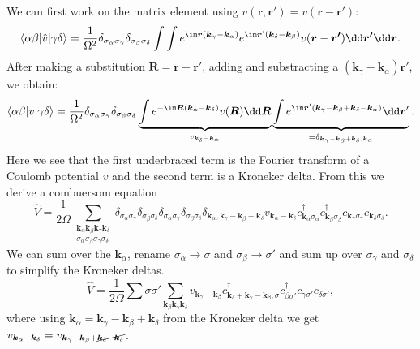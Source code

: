 \documentclass[../main.tex]{subfile}
\begin{document}
We can first work on the matrix element using $v(\bm{r}, \bm{r'})= v(\bm{r} - \bm{r'})$:
\[
    \langle \alpha \beta |\hat{v}|\gamma\delta\rangle = \frac{1}{\Omega^2} \delta_{\sigma_{\alpha}\sigma_{\gamma}}\delta_{\sigma_{\beta}\sigma_{\delta}} \int \int  e^{\im \bm{r}(\bm{k}_{\gamma}-\bm{k}_{\alpha})}  e^{\im \bm{r}'(\bm{k}_{\delta}-\bm{k}_{\beta})} v(\bm{r} - \bm{r'}) \dd \bm{r'} \dd \bm{r}.
\]
After making a substitution $\bm{R} = \bm{r} - \bm{r}'$, adding and substracting a $(\bm{k}_{\gamma}-\bm{k}_{\alpha})\bm{r}'$, we obtain:
\[
    \langle \alpha \beta |v|\gamma\delta\rangle = \frac{1}{\Omega^2} \delta_{\sigma_{\alpha}\sigma_{\gamma}}\delta_{\sigma_{\beta}\sigma_{\delta}}
     \underbrace{\int e^{-\im\bm{R}(\bm{k}_{\alpha}- \bm{k}_{\delta})} v(\bm{R}) \dd \bm{R}}_{v_{\bm{k}_{\delta}- \bm{k}_{\alpha}}}
    \underbrace{\int e^{\im\bm{r}'\left(\bm{k}_{\gamma}-\bm{k}_{\beta} + \bm{k}_{\delta} -\bm{k}_{\alpha}\right)}\dd \bm{r}'}_{= \delta_{\bm{k}_{\gamma}-\bm{k}_{\beta} + \bm{k}_{\delta} , \bm{k}_{\alpha}}}.
\]
Here we see that the first underbraced term is the Fourier transform of a Coulomb potential $v$ and the second term is a Kroneker delta.
From this we derive a combuersom equation
\[
    \hat{V} = \frac{1}{2\Omega} \sum_{\substack{\bm{k}_{\alpha}\bm{k}_{\beta}\bm{k}_{\gamma}\bm{k}_{\delta} \\
         \sigma_{\alpha}\sigma_{\beta}\sigma_{\gamma}\sigma_{\delta}}}
    \delta_{\sigma_{\alpha}\sigma_{\gamma}}\delta_{\sigma_{\beta}\sigma_{\delta}}
    \delta_{\sigma_{\alpha}\sigma_{\gamma}}\delta_{\sigma_{\beta}\sigma_{\delta}}
    \delta_{ \bm{k}_{\alpha}, \bm{k}_{\gamma}-\bm{k}_{\beta} + \bm{k}_{\delta}}
    v_{\bm{k}_{\alpha}- \bm{k}_{\delta}} c_{\bm{k}_\alpha\sigma_{\alpha}}^{\dagger}c_{\bm{k}_\beta\sigma_{\beta}}^{\dagger}c_{\bm{k}_\gamma\sigma_{\gamma}}c_{\bm{k}_\delta\sigma_{\delta}}.
\]
We can sum over the $\bm{k}_{\alpha}$, rename $\sigma_{\alpha} \rightarrow\sigma$ and $\sigma_{\beta} \rightarrow\sigma'$
 and sum up over $\sigma_{\gamma}$ and $\sigma_{\delta}$ to simplify the Kroneker deltas.
\[
    \hat{V} = \frac{1}{2\Omega} \sum{\sigma\sigma'} \sum_{\bm{k}_{\beta}\bm{k}_{\gamma}\bm{k}_{\delta}} v_{\bm{k}_{\gamma}- \bm{k}_{\beta}} c^{\dagger}_{\bm{k}_{\delta}+ \bm{k}_{\gamma}-\bm{k}_{\beta},\sigma}
        c^{\dagger}_{\beta\sigma'} c_{\gamma\sigma'} c_{\delta\sigma'} ,
\] 
where using $\bm{k}_{\alpha} = \bm{k}_{\gamma}-\bm{k}_{\beta} + \bm{k}_{\delta}$ from the Kroneker delta we get $v_{\bm{k}_{\alpha}- \bm{k}_{\delta}} = v_{\bm{k}_{\gamma}-\bm{k}_{\beta} + \cancel{\bm{k}_{\delta}-\bm{k}_{\delta}}}$.
\end{document}
